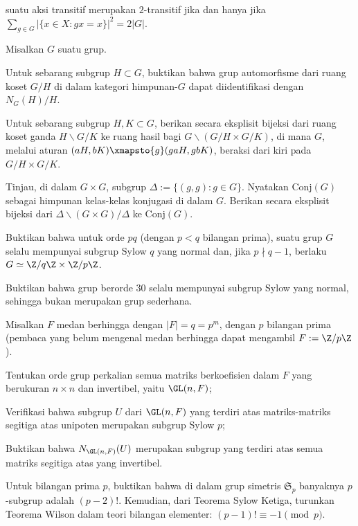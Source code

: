 \begin{Exercises}
\begin{compactenum}[(i)]
			\item suatu aksi transitif merupakan $2$-transitif jika dan hanya jika $\sum_{g \in G} |\{x \in X : gx=x \}|^2 = 2|G|$.
		\end{compactenum}
	\item Misalkan $G$ suatu grup.
		\begin{compactenum}[(i)]
			\item Untuk sebarang subgrup $H \subset G$, buktikan bahwa grup automorfisme dari ruang koset $G/H$ di dalam kategori himpunan-$G$ dapat diidentifikasi dengan $N_G(H)/H$.
			\item Untuk sebarang subgrup $H, K \subset G$, berikan secara eksplisit bijeksi dari ruang koset ganda $H \backslash G / K$ ke ruang hasil bagi $G \backslash \left(G/H \times G/K \right)$, di mana $G$, melalui aturan $(aH, bK) \xmapsto{g} (gaH, gbK)$, beraksi dari kiri pada $G/H \times G/K$.
			\item Tinjau, di dalam $G \times G$, subgrup $\Delta := \{(g,g) : g \in G \}$. Nyatakan $\text{Conj}(G)$ sebagai himpunan kelas-kelas konjugasi di dalam $G$. Berikan secara eksplisit bijeksi dari $\Delta \backslash (G \times G) /\Delta$ ke $\text{Conj}(G)$.
		\end{compactenum}
	\item Buktikan bahwa untuk orde $pq$ (dengan $p < q$ bilangan prima), suatu grup $G$ selalu mempunyai subgrup Sylow $q$ yang normal dan, jika $p \nmid q-1$, berlaku $G \simeq \Z/q\Z \times \Z/p\Z$.
	\item Buktikan bahwa grup berorde $30$ selalu mempunyai subgrup Sylow yang normal, sehingga bukan merupakan grup sederhana.
	\item Misalkan $F$ medan berhingga dengan $|F|=q=p^m$, dengan $p$ bilangan prima (pembaca yang belum mengenal medan berhingga dapat mengambil $F := \Z/p\Z$).
		\begin{compactenum}[(i)]
			\item Tentukan orde grup perkalian semua matriks berkoefisien dalam $F$ yang berukuran $n \times n$ dan invertibel, yaitu $\GL(n, F)$;
			\item Verifikasi bahwa subgrup $U$ dari $\GL(n,F)$ yang terdiri atas matriks-matriks segitiga atas unipoten merupakan subgrup Sylow $p$;
			\item Buktikan bahwa $N_{\GL(n,F)}(U)$ merupakan subgrup yang terdiri atas semua matriks segitiga atas yang invertibel.
		\end{compactenum}
	\item Untuk bilangan prima $p$, buktikan bahwa di dalam grup simetris $\mathfrak{S}_p$ banyaknya $p$-subgrup adalah $(p-2)!$. Kemudian, dari Teorema Sylow Ketiga, turunkan Teorema Wilson dalam teori bilangan elementer: $(p-1)! \equiv -1 \pmod p$.

\end{Exercises}
